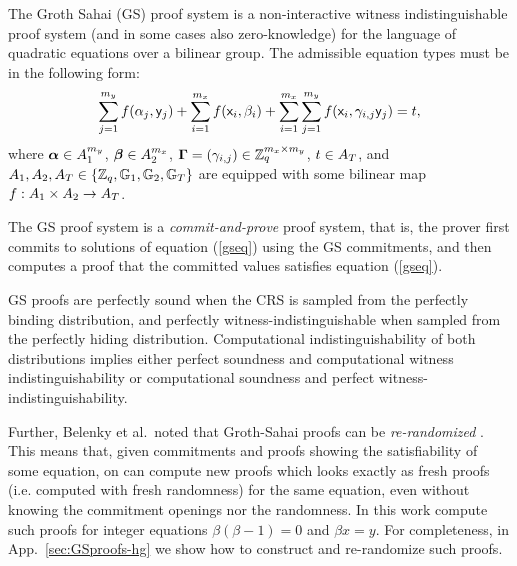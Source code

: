 
The Groth Sahai (GS) proof system is a non-interactive witness indistinguishable proof system (and in some cases also zero-knowledge) for the language of quadratic equations over a bilinear group. The admissible equation types must be in the following form:
\begin{equation}\label{gseq}
\sum_{j=1}^{m_y} f(\alpha_j, \mathsf{y}_j)+\sum_{i=1}^{m_x} f(\mathsf{x}_i, \beta_i)+\sum_{i=1}^{m_x} \sum_{j=1}^{m_y}  f(\mathsf{x}_i,\gamma_{i,j} \mathsf{y}_j)=t,
\end{equation}
 where $\boldsymbol \alpha  \in A_1^{m_y}$, $\boldsymbol \beta  \in A_2^{m_x}$, $\mathbf{{\Gamma}}=(\gamma_{i,j}) \in \mathbb{Z}_q^{m_x\times m_y}$, $t \in A_T$, and $A_1,A_2,A_T\in\{\mathbb{Z}_q,\mathbb{G}_1,\mathbb{G}_2, \mathbb{G}_T\}$ 
are equipped with some bilinear map $f:A_1\times A_2 \rightarrow A_T$.

The GS proof system is a \emph{commit-and-prove} proof system, that is, the prover first commits to solutions
of equation (\ref{gseq}) using the GS commitments, and then computes a proof that the committed values satisfies equation (\ref{gseq}).

GS proofs are perfectly sound when the CRS is sampled from the perfectly binding distribution, and perfectly witness-indistinguishable when sampled from the perfectly hiding distribution. Computational indistinguishability of  both distributions implies either perfect soundness and computational witness indistinguishability or computational soundness and perfect witness-indistinguishability.

Further, Belenky et al.~noted that Groth-Sahai proofs can be \emph{re-randomized} \cite{C:BCCKLS09}. This means that, given commitments and proofs showing the satisfiability of some equation, on can compute new proofs which looks exactly as fresh proofs (i.e. computed with fresh randomness) for the same equation, even without knowing the commitment openings nor the randomness. In this work compute such proofs for integer equations $\beta(\beta-1)=0$ and $\beta x = y$. \ifPKC\else For completeness, in App.~\ref{sec:GSproofs-hg} we show how to construct and re-randomize such proofs.\fi

